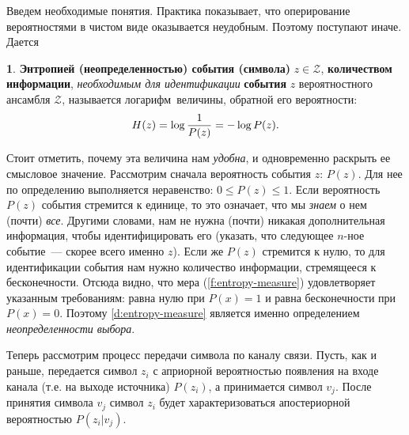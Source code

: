 \documentclass[12pt,a4paper,openright]{book}
\theoremstyle{definition}
\newtheorem{definition}{\textls[150]{Определение}}[chapter]
\numberwithin{equation}{chapter}
\begin{document}
	Введем необходимые понятия. Практика показывает, что оперирование вероятностями в чистом виде оказывается неудобным. Поэтому поступают иначе. Дается
	\begin{definition}\label{d:entropy-measure}
		\textbf{Энтропией (неопределенностью) события (символа)} $z \in \mathcal{Z}$, \textbf{количеством информации}, \textit{необходимым для идентификации} \textbf{события} $z$ вероятностного ансамбля $\mathcal{Z}$, называется логарифм\footnotemark\ величины, обратной его вероятности:
		\begin{equation}\label{f:entropy-measure}
			H(z) = \log {1 \over P(z)} = - \log P(z) \text{.}
		\end{equation}
	\end{definition}
	Стоит отметить, почему эта величина нам \textit{удобна}, и одновременно раскрыть ее смысловое значение. Рассмотрим сначала вероятность события $z$: $P(z)$. Для нее по определению выполняется неравенство: $0 \le P(z) \le 1$. Если вероятность $P(z)$ события стремится к единице, то это означает, что мы \textit{знаем} о нем (почти) \textit{все}. Другими словами, нам не нужна (почти) никакая дополнительная информация, чтобы идентифицировать его (указать, что следующее $n$-ное событие~--- скорее всего именно $z$). Если же $P(z)$ стремится к нулю, то для идентификации события нам нужно количество информации, стремящееся к бесконечности. Отсюда видно, что мера (\autoref{f:entropy-measure}) удовлетворяет указанным требованиям: равна нулю при $P(x) = 1$ и равна бесконечности при $P(x) = 0$. Поэтому \autoref{d:entropy-measure} является именно определением \textit{неопределенности выбора}.

	Теперь рассмотрим процесс передачи символа по каналу связи. Пусть, как и раньше, передается символ $z_i$ с априорной вероятностью появления на входе канала (т.е. на выходе источника) $P(z_i)$, а принимается символ $v_j$. После принятия символа $v_j$ символ $z_i$ будет характеризоваться апостериорной вероятностью $P(z_i | v_j)$.
\end{document}

